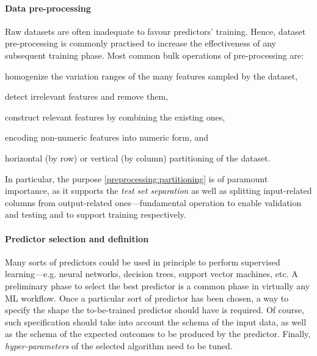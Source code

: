 \documentclass[runningheads]{llncs}
\begin{document}
\paragraph{Data pre-processing}
%
Raw datasets are often inadequate to favour predictors' training.
%
Hence, dataset pre-processing is commonly practised to increase the effectiveness of any subsequent training phase.
%
Most common bulk operations of pre-processing are:
%
\begin{inlinelist}
    \item homogenize the variation ranges of the many features sampled by the dataset,
    \item detect irrelevant features and remove them,
    \item construct relevant features by combining the existing ones,
    \item encoding non-numeric features into numeric form, and
    \item\label{preprocessing:partitioning} horizontal (by row) or vertical (by column) partitioning of the dataset.
\end{inlinelist}
%
In particular, the purpose \ref{preprocessing:partitioning} is of paramount importance, as it supports the \emph{test set separation} as well as splitting input-related columns from output-related ones---fundamental operation to enable validation and testing and to support training respectively.

\paragraph{Predictor selection and definition}
%
Many sorts of predictors could be used in principle to perform supervised learning---e.g. neural networks, decision trees, support vector machines, etc.
%
A preliminary phase to select the best predictor is a common phase in virtually any ML workflow.
%
Once a particular sort of predictor has been chosen, a way to specify the shape the to-be-trained predictor should have is required.
%
Of course, such specification should take into account the schema of the input data, as well as the schema of the expected outcomes to be produced by the predictor.
%
Finally, \emph{hyper-parameters} of the selected algorithm need to be tuned.
%
\end{document}
